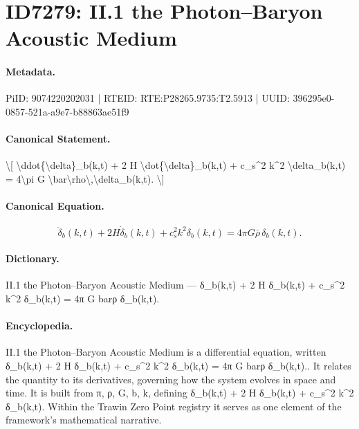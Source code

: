 \section*{ID7279: II.1 the Photon–Baryon Acoustic Medium}
\paragraph{Metadata.}
PiID: 9074220202031 | RTEID: RTE:P28265.9735:T2.5913 | UUID: 396295e0-0857-521a-a9e7-b88863ae51f9

\paragraph{Canonical Statement.}
\textbackslash{}[ \textbackslash{}ddot\{\textbackslash{}delta\}\_b(k,t) + 2 H \textbackslash{}dot\{\textbackslash{}delta\}\_b(k,t) + c\_s\textasciicircum{}2 k\textasciicircum{}2 \textbackslash{}delta\_b(k,t) = 4\textbackslash{}pi G \textbackslash{}bar\textbackslash{}rho\textbackslash{},\textbackslash{}delta\_b(k,t). \textbackslash{}]

\paragraph{Canonical Equation.}
\[
\ddot{\delta}_b(k,t) + 2 H \dot{\delta}_b(k,t) + c_s^2 k^2 \delta_b(k,t) = 4\pi G \bar\rho\,\delta_b(k,t).
\]

\paragraph{Dictionary.}
II.1 the Photon–Baryon Acoustic Medium — δ\_b(k,t) + 2 H δ\_b(k,t) + c\_s\textasciicircum{}2 k\textasciicircum{}2 δ\_b(k,t) = 4π G barρ δ\_b(k,t).

\paragraph{Encyclopedia.}
II.1 the Photon–Baryon Acoustic Medium is a differential equation, written δ\_b(k,t) + 2 H δ\_b(k,t) + c\_s\textasciicircum{}2 k\textasciicircum{}2 δ\_b(k,t) = 4π G barρ δ\_b(k,t).. It relates the quantity to its derivatives, governing how the system evolves in space and time. It is built from π, ρ, G, b, k, defining δ\_b(k,t) + 2 H δ\_b(k,t) + c\_s\textasciicircum{}2 k\textasciicircum{}2 δ\_b(k,t). Within the Trawin Zero Point registry it serves as one element of the framework's mathematical narrative.
